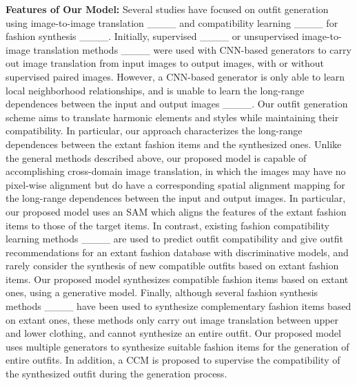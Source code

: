 \textbf{Features of Our Model:} Several studies have focused on outfit generation using image-to-image translation ____ and compatibility learning ____ for fashion synthesis ____. Initially, supervised ____ or unsupervised image-to-image translation methods ____ were used with CNN-based generators to carry out image translation from input images to output images, with or without supervised paired images. However, a CNN-based generator is only able to learn local neighborhood relationships, and is unable to learn the long-range dependences between the input and output images ____. Our outfit generation scheme aims to translate harmonic elements and styles while maintaining their compatibility. In particular, our approach characterizes the long-range dependences between the extant fashion items and the synthesized ones. Unlike the general methods described above, our proposed model is capable of accomplishing cross-domain image translation, in which the images may have no pixel-wise alignment but do have a corresponding spatial alignment mapping for the long-range dependences between the input and output images. In particular, our proposed model uses an SAM which aligns the features of the extant fashion items to those of the target items. In contrast, existing fashion compatibility learning methods ____ are used to predict outfit compatibility and give outfit recommendations for an extant fashion database with discriminative models, and rarely consider the synthesis of new compatible outfits based on extant fashion items. Our proposed model synthesizes compatible fashion items based on extant ones, using a generative model. Finally, although several fashion synthesis methods ____ have been used to synthesize complementary fashion items based on extant ones, these methods only carry out image translation between upper and lower clothing, and cannot synthesize an entire outfit. Our proposed model uses multiple generators to synthesize suitable fashion items for the generation of entire outfits. In addition, a CCM is proposed to supervise the compatibility of the synthesized outfit during the generation process.